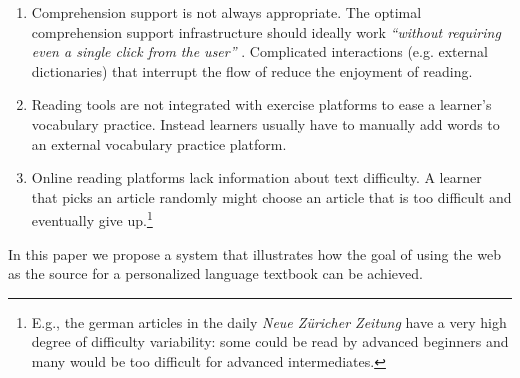 \begin{enumerate}
	
  \item Comprehension support is not always appropriate. The optimal comprehension support infrastructure should ideally work {\em ``without requiring even a single click from the user''} \cite{Proszeky02-Comprehension}. 
  Complicated interactions (e.g. external dictionaries) that interrupt the flow of reduce the enjoyment of reading.

  \item Reading tools are not integrated with exercise platforms to ease a learner's vocabulary practice. Instead learners usually have to manually add words to an external vocabulary practice platform. 
  
  \item Online reading platforms lack information about text difficulty. A learner that picks an article randomly might choose an article that is too difficult and eventually give up.\footnote{E.g., the german articles in the  daily {\em Neue Z\"uricher Zeitung} have a very high degree of difficulty variability: some could be read by advanced beginners and many would be too difficult for advanced intermediates.}

  
\end{enumerate}

In this paper we propose a system that illustrates how the goal of using the web as the source for a personalized language textbook can be achieved.




	
	


